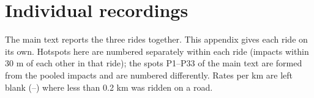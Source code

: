 
\section{Individual recordings}\label{individual-recordings}

The main text reports the three rides together. This appendix gives each ride on its
own. Hotspots here are numbered separately within each ride (impacts within 30 m of
each other in that ride); the spots P1--P33 of the main text are formed from the pooled
impacts and are numbered differently. Rates per km are left blank (--) where less than
0.2 km was ridden on a road.


